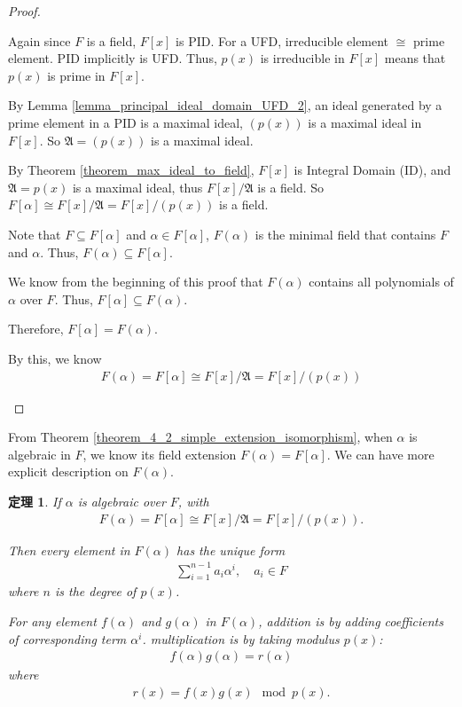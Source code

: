 \documentclass[utf8]{ctexbook}
\newtheorem{theorem}{定理}[section]
\begin{document}
\begin{proof}
\begin{enumerate}
{Again since $F$ is a field, $F[x]$ is PID. For a UFD, irreducible element $\cong$ prime element. PID implicitly is UFD. Thus, $p(x)$ is irreducible in $F[x]$ means that $p(x)$ is prime in $F[x]$.

By Lemma \ref{lemma_principal_ideal_domain_UFD_2}, an ideal generated by a prime element in a PID is a maximal ideal, $(p(x))$ is a maximal ideal in $F[x]$. So $\mathfrak{A}= (p(x))$ is a maximal ideal.

By Theorem \ref{theorem_max_ideal_to_field}, $F[x]$ is Integral Domain (ID), and $\mathfrak{A} = p(x)$ is a maximal ideal, thus $F[x] / \mathfrak{A}$ is a field. So $F[\alpha] \cong F[x] / \mathfrak{A} = F[x] / (p(x))$ is a field.

Note that $F \subseteq F[\alpha]$ and $\alpha \in F[\alpha]$, $F(\alpha)$ is the minimal field that contains $F$ and $\alpha$. Thus, $F(\alpha) \subseteq F[\alpha]$.

We know from the beginning of this proof that $F(\alpha)$ contains all polynomials of $\alpha$ over $F$. Thus, $F[\alpha] \subseteq F(\alpha)$.

Therefore, $F[\alpha] = F(\alpha)$.

By this, we know
\begin{align*}
F(\alpha) = F[\alpha] \cong F[x] / \mathfrak{A} = F[x] / (p(x))
\end{align*}

}
\end{enumerate}


\end{proof}

From Theorem \ref{theorem_4_2_simple_extension_isomorphism}, when $\alpha$ is algebraic in $F$, we know its field extension $F(\alpha) = F[\alpha]$. We can have more explicit description on $F(\alpha)$.

\begin{theorem}
\label{theorem_4_2_simple_algebraic_extension_explicit}
If $\alpha$ is algebraic over $F$, with
\begin{align*}
F(\alpha) = F[\alpha] \cong F[x] / \mathfrak{A} = F[x] / (p(x)) .
\end{align*}

Then every element in $F(\alpha)$ has the unique form
\begin{align*}
\sum_{i=1} ^{n-1} a_i \alpha^i, \quad a_i \in F
\end{align*}
where $n$ is the degree of $p(x)$.

For any element $f(\alpha)$ and $g(\alpha)$ in $F(\alpha)$, addition is by adding coefficients of corresponding term $\alpha^i$. multiplication is by taking modulus $p(x)$:
\begin{align*}
f(\alpha) g(\alpha) = r(\alpha)
\end{align*}
where
\begin{align*}
r(x) = f(x) g(x) \mod p(x).
\end{align*}
\end{theorem}
\end{document}

